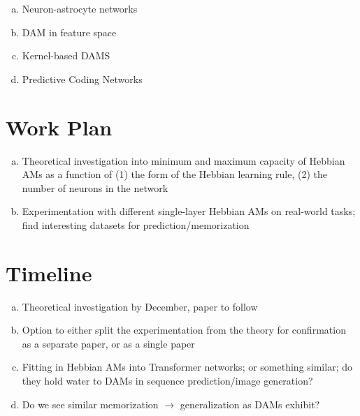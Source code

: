\documentclass{article}
\theoremstyle{definition}
\begin{document}
\begin{enumerate}[(a)]
  \item Neuron-astrocyte networks
  \item DAM in feature space
  \item Kernel-based DAMS
  \item Predictive Coding Networks
\end{enumerate}

\section{Work Plan}

\begin{enumerate}[(a)]
  \item Theoretical investigation into minimum and maximum capacity
    of Hebbian AMs
    as a function of (1) the form of the Hebbian learning rule, (2)
    the number of neurons in the network
  \item Experimentation with different single-layer Hebbian AMs on
    real-world tasks;
    find interesting datasets for prediction/memorization
\end{enumerate}

\section{Timeline}

\begin{enumerate}[(a)]
  \item Theoretical investigation by December, paper to follow
  \item Option to either split the experimentation from the theory
    for confirmation as a separate
    paper, or as a single paper
  \item Fitting in Hebbian AMs into Transformer networks; or
    something similar; do they hold
    water to DAMs in sequence prediction/image generation?
  \item Do we see similar memorization $\to$ generalization as DAMs exhibit?
\end{enumerate}

\printbibliography
\end{document}
